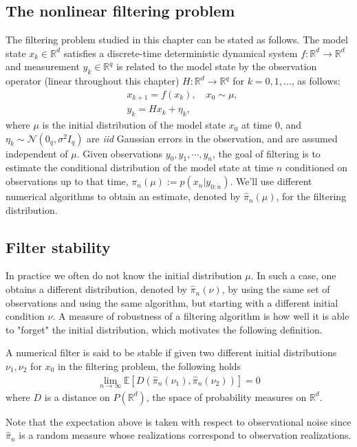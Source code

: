 
\subsection{The nonlinear filtering problem} The filtering problem studied in this chapter can be stated as follows. The model state $x_k \in \mathbb{R}^d$ satisfies a discrete-time deterministic dynamical system $f: \mathbb{R}^d \to \mathbb{R}^d$ and measurement $y_k \in \mathbb{R}^q$ is related to the model state by the observation operator (linear throughout this chapter) $H: \mathbb{R}^d \to \mathbb{R}^q$ for $k = 0, 1, \dots$, as follows:
\begin{align}
&x_{k+1} = f(x_k), \quad x_0 \sim \mu, \label{eq-state--numerical-fs}\\
&y_{k} = Hx_k + \eta_k, \quad  \label{eq-obs--numerical-fs}
\end{align}
where $\mu$ is the initial distribution of the model state $x_0$ at time 0,  and $\eta_k \sim \mathcal{N}(0_q, \sigma^2I_q)$ are \emph{iid} Gaussian errors in the observation, and are assumed independent of $\mu$. Given observations $y_0, y_1, \cdots, y_n$, the goal of filtering is to estimate the conditional distribution of the model state at time $n$ conditioned on observations up to that time, $\pi_{n}(\mu) := p(x_n|y_{0:n})$. We'll use different numerical algorithms to obtain an estimate, denoted by $\hat\pi_{n}(\mu)$, for the filtering distribution.

\subsection{Filter stability} 
In practice we often do not know the initial distribution $\mu$. In such a case, one obtains a different distribution, denoted by $\hat\pi_{n}(\nu)$, by using the same set of observations and using the same algorithm, but starting with a different initial condition $\nu$. A measure of robustness of a filtering algorithm is how well it is able to "forget" the initial distribution, which motivates the following definition.
\begin{defn}[Stability] A numerical filter is said to be stable if given two different initial distributions {$\nu_1, \nu_2$} for $x_0$ in the filtering problem, the following holds
\begin{align}
    {\lim_{n\to\infty}\mathbb E[D(\hat\pi_n(\nu_1), \hat\pi_n(\nu_2))]} = 0
\label{eq-stablaw--numerical-fs} \end{align}
where $D$ is a distance on $P(\mathbb R^d)$, the space of probability measures on $\mathbb R^d$.
\label{def-stab--numerical-fs} \end{defn}
 Note that the expectation above is taken with respect to observational noise since $\hat\pi_n$ is a random measure whose realizations correspond to observation realizations.

